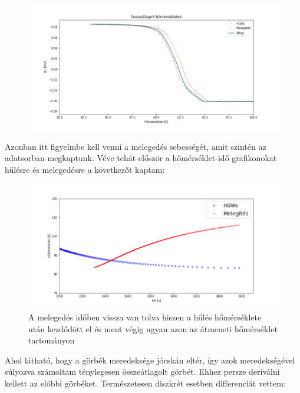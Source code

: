 \documentclass[a4paper,12pt]{article}
\begin{document}
\begin{figure}[!htb]
\centering
\includegraphics[width=.95\textwidth]{coolingAndHeatingWithMean.png}
\end{figure}

\vspace{2mm}

\par Azonban itt figyelmbe kell venni a melegedés sebességét, amit szintén az adatsorban megkaptunk. Véve tehát először a hőmérséklet-idő grafikonokat hűlésre és melegedésre a következőt kaptam:

\vspace{2mm}

\begin{figure}[!htb]
\centering
\includegraphics[width=.95\textwidth]{tempCoolingHeating.png}
\caption{ A melegedés időben vissza van tolva hiszen a hűlés hőmérséklete után kezdődött el és ment végig ugyan azon az átmeneti hőmérséklet tartományon  }
\end{figure}

\vspace{2mm}

\par Ahol látható, hogy a görbék meredeksége jócskán eltér, így azok meredekségével súlyozva számoltam ténylegesen összeátlagolt görbét. Ehhez persze deriválni kellett az előbbi görbéket. Természetesen diszkrét esetben differenciát vettem:
\end{document}
